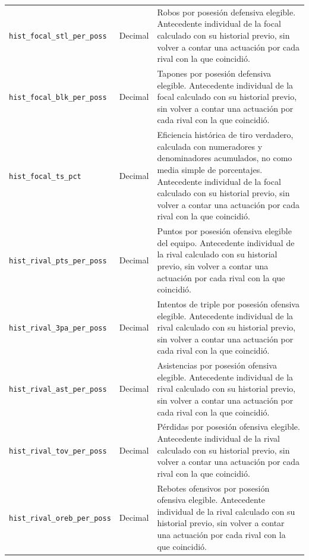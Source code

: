 \begin{longtable}{@{}>{\raggedright\arraybackslash}p{5.0cm}>{\raggedright\arraybackslash}p{1.9cm}>{\raggedright\arraybackslash}p{7.7cm}@{}}
\texttt{hist\_\allowbreak focal\_\allowbreak stl\_\allowbreak per\_\allowbreak poss} & Decimal & Robos por posesión defensiva elegible. Antecedente individual de la focal calculado con su historial previo, sin volver a contar una actuación por cada rival con la que coincidió.\\
\texttt{hist\_\allowbreak focal\_\allowbreak blk\_\allowbreak per\_\allowbreak poss} & Decimal & Tapones por posesión defensiva elegible. Antecedente individual de la focal calculado con su historial previo, sin volver a contar una actuación por cada rival con la que coincidió.\\
\texttt{hist\_\allowbreak focal\_\allowbreak ts\_\allowbreak pct} & Decimal & Eficiencia histórica de tiro verdadero, calculada con numeradores y denominadores acumulados, no como media simple de porcentajes. Antecedente individual de la focal calculado con su historial previo, sin volver a contar una actuación por cada rival con la que coincidió.\\
\texttt{hist\_\allowbreak rival\_\allowbreak pts\_\allowbreak per\_\allowbreak poss} & Decimal & Puntos por posesión ofensiva elegible del equipo. Antecedente individual de la rival calculado con su historial previo, sin volver a contar una actuación por cada rival con la que coincidió.\\
\texttt{hist\_\allowbreak rival\_\allowbreak 3pa\_\allowbreak per\_\allowbreak poss} & Decimal & Intentos de triple por posesión ofensiva elegible. Antecedente individual de la rival calculado con su historial previo, sin volver a contar una actuación por cada rival con la que coincidió.\\
\texttt{hist\_\allowbreak rival\_\allowbreak ast\_\allowbreak per\_\allowbreak poss} & Decimal & Asistencias por posesión ofensiva elegible. Antecedente individual de la rival calculado con su historial previo, sin volver a contar una actuación por cada rival con la que coincidió.\\
\texttt{hist\_\allowbreak rival\_\allowbreak tov\_\allowbreak per\_\allowbreak poss} & Decimal & Pérdidas por posesión ofensiva elegible. Antecedente individual de la rival calculado con su historial previo, sin volver a contar una actuación por cada rival con la que coincidió.\\
\texttt{hist\_\allowbreak rival\_\allowbreak oreb\_\allowbreak per\_\allowbreak poss} & Decimal & Rebotes ofensivos por posesión ofensiva elegible. Antecedente individual de la rival calculado con su historial previo, sin volver a contar una actuación por cada rival con la que coincidió.\\

\end{longtable}
